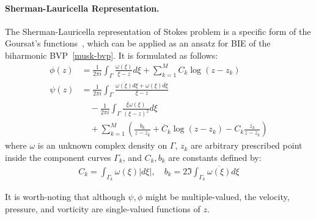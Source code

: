 \documentclass[10pt,twocolumn,letterpaper]{article}
\begin{document}
\paragraph{Sherman-Lauricella Representation.} 
The Sherman-Lauricella representation of Stokes problem is a specific form of 
the Goursat's functions~\cite{greengardIntegralEquationMethods1996}, 
which can be applied as an ansatz for BIE of the biharmonic BVP~\eqref{musk-bvp}. 
It is formulated as follows:
\begin{align}
  \phi(z) & =
  \frac {1}{2\pi i} \int_\Gamma \frac{\omega(\xi)}{\xi - z} d\xi
  + \sum_{k=1}^M C_k \log (z-z_k) \label{sl-phi}
  \\
  \psi(z) & =
  \frac {1}{2\pi i} \int_\Gamma \frac{\overline{\omega(\xi)}d\xi  +  \omega(\xi)\overline{d\xi}}{\xi - z} \\
  & \quad - \frac {1}{2\pi i} 
    \int_\Gamma \frac{\overline{\xi} \omega(\xi)}{{(\xi - z)}^2} d\xi  \label{sl-psi} \nonumber \\
          & \quad + \sum _{k=1}^M
  \left( \frac{b_k}{z-z_k} + \overline C_k \log (z-z_k) -  C_k \frac{\overline z_k}{z-z_k} \right) \nonumber
\end{align}
where $\omega$ is an unknown complex density on $\Gamma$,
$z_k$ are arbitrary prescribed point inside the component curves $\Gamma_k$,
and $C_k, b_k$ are constants defined by:
\begin{align}
  C_k = \int_{\Gamma_k} \omega(\xi) |d\xi|, \quad b_k = 2 \Im\int_{\Gamma_k} \overline{\omega(\xi)} {d\xi}
\end{align}

It is worth-noting that although $\psi, \phi$ might be multiple-valued, 
the velocity, pressure, and vorticity are single-valued functions of $z$.
\end{document}
